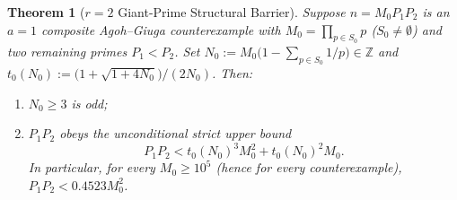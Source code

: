 \documentclass[11pt]{article}
\newtheorem{theorem}{Theorem}[section]
\theoremstyle{remark}
\begin{document}
\begin{theorem}[$r = 2$ Giant-Prime Structural Barrier]\label{thm:barrier}
Suppose $n = M_0 P_1 P_2$ is an $a = 1$ composite Agoh--Giuga counterexample
with $M_0 = \prod_{p\in S_0} p$ ($S_0 \neq \emptyset$) and two remaining primes
$P_1 < P_2$. Set $N_0 := M_0\bigl(1 - \sum_{p\in S_0} 1/p\bigr) \in \mathbb{Z}$
and $t_0(N_0) := \bigl(1 + \sqrt{1 + 4N_0}\bigr)/(2N_0)$. Then:
\begin{enumerate}
  \item $N_0 \ge 3$ is odd;
  \item $P_1 P_2$ obeys the unconditional strict upper bound
  \begin{equation}\label{eq:r2-bound}
    P_1 P_2 < t_0(N_0)^3 M_0^2 + t_0(N_0)^2 M_0.
  \end{equation}
  In particular, for every $M_0 \ge 10^5$ (hence for every counterexample),
  $P_1 P_2 < 0.4523 M_0^2$.
\end{enumerate}
\end{theorem}
\end{document}
